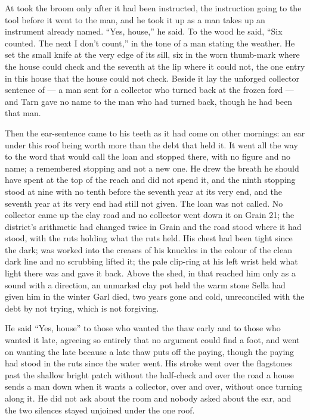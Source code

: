 At   took the broom only after it had been instructed, the instruction going to the tool before it went to the man, and he took it up as a man takes up an instrument already named. “Yes, house,” he said. To the wood he said, “Six counted. The next I don't count,” in the tone of a man stating the weather. He set the small knife at the very edge of its sill, six in the worn thumb-mark where the house could check and the seventh at the lip where it could not, the one entry in this house that the house could not check. Beside it lay the unforged collector sentence of  --- a man sent for a collector who turned back at the frozen ford --- and Tarn gave no name to the man who had turned back, though he had been that man.

Then the ear-sentence came to his teeth as it had come on other mornings: an ear under this roof being worth more than the debt that held it. It went all the way to the word that would call the loan and stopped there, with no figure and no name; a remembered stopping and not a new one. He drew the breath he should have spent at the top of the reach and did not spend it, and the ninth stopping stood at nine with no tenth before the seventh year at its very end, and the seventh year at its very end had still not given. The loan was not called. No collector came up the clay road and no collector went down it on Grain 21; the district's arithmetic had changed twice in Grain and the road stood where it had stood, with the ruts holding what the ruts held. His chest had been tight since the dark;  was worked into the creases of his knuckles in the colour of the clean dark line and no scrubbing lifted it; the pale clip-ring at his left wrist held what light there was and gave it back. Above the shed, in  that reached him only as a sound with a direction, an unmarked clay pot held the warm stone Sella had given him in the winter Garl died, two years gone and cold, unreconciled with the debt by not trying, which is not forgiving.

He said “Yes, house” to those who wanted the thaw early and to those who wanted it late, agreeing so entirely that no argument could find a foot, and went on wanting the late because a late thaw puts off the paying, though the paying had stood in the ruts since the water went. His stroke went over the flagstones past the shallow bright patch without the half-check and over the road a house sends a man down when it wants a collector, over and over, without once turning along it. He did not ask about the room and nobody asked about the ear, and the two silences stayed unjoined under the one roof.

